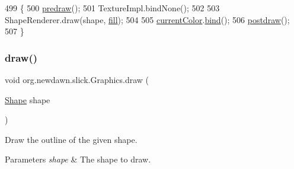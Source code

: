 \begin{DoxyCode}
499                                                   \{
500         \mbox{\hyperlink{classorg_1_1newdawn_1_1slick_1_1_graphics_a7b4c203181e3b6302d51ed9b24596b8d}{predraw}}();
501         TextureImpl.bindNone();
502 
503         ShapeRenderer.draw(shape, \mbox{\hyperlink{classorg_1_1newdawn_1_1slick_1_1_graphics_a7c694d58339cd5e41270cb46aa52929c}{fill}});
504 
505         \mbox{\hyperlink{classorg_1_1newdawn_1_1slick_1_1_graphics_add4b542e574390a735aad66468135d5a}{currentColor}}.\mbox{\hyperlink{classorg_1_1newdawn_1_1slick_1_1_color_ae4b71c94854f7983f2ccdb7340438e23}{bind}}();
506         \mbox{\hyperlink{classorg_1_1newdawn_1_1slick_1_1_graphics_abe054371d1486618ff327bbbcf02ff97}{postdraw}}();
507     \}
\end{DoxyCode}
\mbox{\label{classorg_1_1newdawn_1_1slick_1_1_graphics_af8e80c71c83cd2c56f936d5867f0f733}} 
\subsubsection{\texorpdfstring{draw()}{draw()}\hspace{0.1cm}{\footnotesize\ttfamily [2/2]}}
{\footnotesize\ttfamily void org.\+newdawn.\+slick.\+Graphics.\+draw (\begin{DoxyParamCaption}\item[{\mbox{\hyperlink{classorg_1_1newdawn_1_1slick_1_1geom_1_1_shape}{Shape}}}]{shape }\end{DoxyParamCaption})\hspace{0.3cm}{\ttfamily [inline]}}

Draw the outline of the given shape.


\begin{DoxyParams}{Parameters}
{\em shape} & The shape to draw. \\
\hline
\end{DoxyParams}

